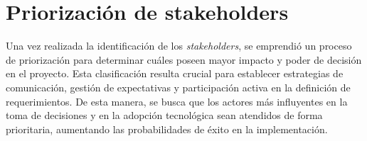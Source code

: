 \section{Priorización de stakeholders}
Una vez realizada la identificación de los \textit{stakeholders}, se emprendió un proceso de priorización para determinar cuáles poseen mayor impacto y poder de decisión en el proyecto. Esta clasificación resulta crucial para establecer estrategias de comunicación, gestión de expectativas y participación activa en la definición de requerimientos. De esta manera, se busca que los actores más influyentes en la toma de decisiones y en la adopción tecnológica sean atendidos de forma prioritaria, aumentando las probabilidades de éxito en la implementación.



